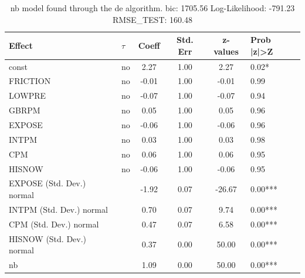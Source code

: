 \begin{table}
	\caption{nb model found through the de algorithm. bic: 1705.56 Log-Likelihood: -791.23 RMSE_TEST: 160.48}
	\begin{center}
		\begin{tabular}{|l|l|c|c|c|l|}
			\hline
			Effect & $\tau$ & Coeff & Std. Err & z-values & Prob |z|>Z \\
			\hline
			const & no & 2.27 & 1.00 & 2.27 & 0.02* \\
			\hline
			FRICTION & no & -0.01 & 1.00 & -0.01 & 0.99 \\
			\hline
			LOWPRE & no & -0.07 & 1.00 & -0.07 & 0.94 \\
			\hline
			GBRPM & no & 0.05 & 1.00 & 0.05 & 0.96 \\
			\hline
			EXPOSE & no & -0.06 & 1.00 & -0.06 & 0.96 \\
			\hline
			INTPM & no & 0.03 & 1.00 & 0.03 & 0.98 \\
			\hline
			CPM & no & 0.06 & 1.00 & 0.06 & 0.95 \\
			\hline
			HISNOW & no & -0.06 & 1.00 & -0.06 & 0.95 \\
			\hline
			EXPOSE (Std. Dev.) normal &  & -1.92 & 0.07 & -26.67 & 0.00*** \\
			\hline
			INTPM (Std. Dev.) normal &  & 0.70 & 0.07 & 9.74 & 0.00*** \\
			\hline
			CPM (Std. Dev.) normal &  & 0.47 & 0.07 & 6.58 & 0.00*** \\
			\hline
			HISNOW (Std. Dev.) normal &  & 0.37 & 0.00 & 50.00 & 0.00*** \\
			\hline
			nb &  & 1.09 & 0.00 & 50.00 & 0.00*** \\
			\hline
		\end{tabular}
	\end{center}
\end{table}